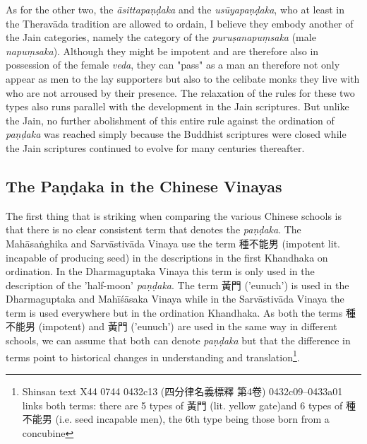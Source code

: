 As for the other two, the {\em āsittapaṇḍaka} and the {\em usūyapaṇḍaka}, who at least in the Theravāda tradition are allowed to ordain, I believe they embody another of the Jain categories, namely the category of the {\em puruṣanapuṃsaka} (male {\em napuṃsaka}). Although they might be impotent and are therefore also in possession of the female {\em veda}, they can "pass" as a man an therefore not only appear as men to the lay supporters but also to the celibate monks they live with who are not arroused by their presence. The relaxation of the rules for these two types also runs parallel with the development in the Jain scriptures. But unlike the Jain, no further abolishment of this entire rule against the ordination of {\em paṇḍaka} was reached simply because the Buddhist scriptures were closed while the Jain scriptures continued to evolve for many centuries thereafter.


\subsection{The Paṇḍaka in the Chinese Vinayas}
The first thing that is striking when comparing the various Chinese schools is that there is no clear consistent term that denotes the {\em paṇḍaka}. The Mahāsaṅghika and Sarvāstivāda Vinaya use the term 種不能男 (impotent lit. incapable of producing seed) in the descriptions in the first Khandhaka on ordination. In the Dharmaguptaka Vinaya this term is only used in the description of the 'half-moon' {\em paṇḍaka}. The term 黃門 ('eunuch') is used in the Dharmaguptaka and Mahīśāsaka Vinaya while in the Sarvāstivāda Vinaya the term is used everywhere but in the ordination Khandhaka. As both the terms 種不能男 (impotent) and 黃門 ('eunuch') are used in the same way in different schools, we can assume that both can denote {\em paṇḍaka} but that the difference in terms point to historical changes in understanding and translation\footnote{Shinsan text X44 0744 0432c13 (四分律名義標釋 第4卷) 0432c09–0433a01 links both terms: there are 5 types of 黃門 (lit. yellow gate)and 6 types of 種不能男 (i.e. seed incapable men), the 6th type being those born from a concubine}.

